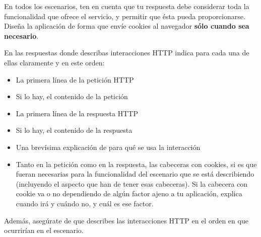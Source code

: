 En todos los escenarios, ten en cuenta que tu respuesta debe considerar toda la funcionalidad que ofrece el servicio, y permitir que ésta pueda proporcionarse. Diseña la aplicación de forma que envíe cookies al navegador {\bf sólo cuando sea necesario}.

En las respuestas donde describas interacciones HTTP indica para cada una de ellas claramente y en este orden:
  \begin{itemize}
  \item La primera línea de la petición HTTP
  \item Si lo hay, el contenido de la petición
  \item La primera línea de la respuesta HTTP
  \item Si lo hay, el contenido de la respuesta
  \item Una brevísima explicación de para qué se usa la interacción
  \item Tanto en la petición como en la respuesta, las cabeceras con cookies, si es que fueran necesarias para la funcionalidad del escenario que se está describiendo (incluyendo el aspecto que han de tener esas cabeceras). Si la cabecera con cookie va o no dependiendo de algún factor ajeno a tu aplicación, explica cuando irá y cuándo no, y cuál es ese factor.
  \end{itemize}

Además, asegúrate de que describes las interacciones HTTP en el orden en que ocurrirían en el escenario.

